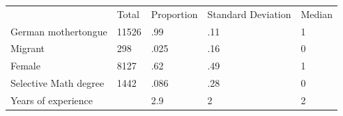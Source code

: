 \documentclass{article}
\begin{document}
\begin{table}[!h]
\centering
\begin{tabular}{lllll}
\cline{1-5}
\multicolumn{1}{|l}{} &
  \multicolumn{1}{|l}{Total} &
  \multicolumn{1}{|l}{Proportion} &
  \multicolumn{1}{|l}{Standard Deviation} &
  \multicolumn{1}{|l|}{Median} \\
\cline{1-5}
\multicolumn{1}{|l}{German mothertongue} &
  \multicolumn{1}{|l}{11526} &
  \multicolumn{1}{|l}{.99} &
  \multicolumn{1}{|l}{.11} &
  \multicolumn{1}{|l|}{1} \\
\cline{1-5}
\multicolumn{1}{|l}{Migrant} &
  \multicolumn{1}{|l}{298} &
  \multicolumn{1}{|l}{.025} &
  \multicolumn{1}{|l}{.16} &
  \multicolumn{1}{|l|}{0} \\
\cline{1-5}
\multicolumn{1}{|l}{Female} &
  \multicolumn{1}{|l}{8127} &
  \multicolumn{1}{|l}{.62} &
  \multicolumn{1}{|l}{.49} &
  \multicolumn{1}{|l|}{1} \\
\cline{1-5}
\multicolumn{1}{|l}{Selective Math degree} &
  \multicolumn{1}{|l}{1442} &
  \multicolumn{1}{|l}{.086} &
  \multicolumn{1}{|l}{.28} &
  \multicolumn{1}{|l|}{0} \\
\cline{1-5}
\multicolumn{1}{|l}{Years of experience} &
  \multicolumn{1}{|l}{} &
  \multicolumn{1}{|l}{2.9} &
  \multicolumn{1}{|l}{2} &
  \multicolumn{1}{|l|}{2} \\
\cline{1-5}
\end{tabular}
\end{table}
\end{document}
